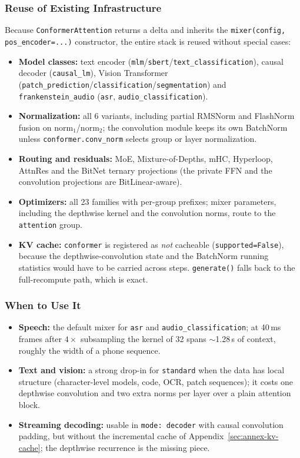 \subsubsection{Reuse of Existing Infrastructure}

Because \texttt{ConformerAttention} returns a delta and inherits the \texttt{mixer(config, pos\_encoder=...)} constructor, the entire stack is reused without special cases:

\begin{itemize}[leftmargin=*]
    \item \textbf{Model classes:} text encoder (\texttt{mlm}/\texttt{sbert}/\texttt{text\_classification}), causal decoder (\texttt{causal\_lm}), Vision Transformer (\texttt{patch\_prediction}/\texttt{classification}/\texttt{segmentation}) and \texttt{frankenstein\_audio} (\texttt{asr}, \texttt{audio\_classification}).
    \item \textbf{Normalization:} all 6 variants, including partial RMSNorm and FlashNorm fusion on $\mathrm{norm}_1$/$\mathrm{norm}_2$; the convolution module keeps its own BatchNorm unless \texttt{conformer.conv\_norm} selects group or layer normalization.
    \item \textbf{Routing and residuals:} MoE, Mixture-of-Depths, mHC, Hyperloop, AttnRes and the BitNet ternary projections (the private FFN and the convolution projections are BitLinear-aware).
    \item \textbf{Optimizers:} all 23 families with per-group prefixes; mixer parameters, including the depthwise kernel and the convolution norms, route to the \texttt{attention} group.
    \item \textbf{KV cache:} \texttt{conformer} is registered as \emph{not} cacheable (\texttt{supported=False}), because the depthwise-convolution state and the BatchNorm running statistics would have to be carried across steps. \texttt{generate()} falls back to the full-recompute path, which is exact.
\end{itemize}

\subsubsection{When to Use It}

\begin{itemize}[leftmargin=*]
    \item \textbf{Speech:} the default mixer for \texttt{asr} and \texttt{audio\_classification}; at 40\,ms frames after $4\times$ subsampling the kernel of 32 spans $\sim$1.28\,s of context, roughly the width of a phone sequence.
    \item \textbf{Text and vision:} a strong drop-in for \texttt{standard} when the data has local structure (character-level models, code, OCR, patch sequences); it costs one depthwise convolution and two extra norms per layer over a plain attention block.
    \item \textbf{Streaming decoding:} usable in \texttt{mode: decoder} with causal convolution padding, but without the incremental cache of Appendix~\ref{sec:annex-kv-cache}; the depthwise recurrence is the missing piece.
\end{itemize}

